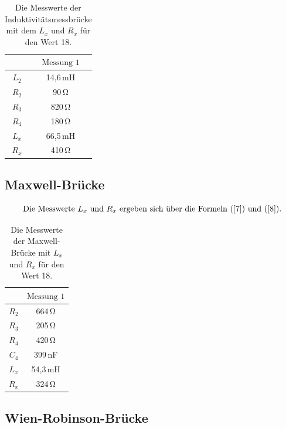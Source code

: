 \begin{table}[H]
    \centering
    \caption{Die Messwerte der Induktivitätsmessbrücke mit dem $L_{x}$ und $R_{x}$ für den Wert 18.}
    \label{Tabelle4}
    \begin{tabular} {c  c}
        \toprule
        {$ $} &
        {$ \text{Messung 1} $} \\
        \midrule
        $L_{2}$ & 14,6\,\unit{\milli\henry}\\
        $R_{2}$ & 90\,\unit{\ohm} \\
        $R_{3}$ & 820\,\unit{\ohm} \\
        $R_{4}$ & 180\,\unit{\ohm} \\
        $L_{x}$ & 66,5\,\unit{\milli\henry}\\
        $R_{x}$ & 410\,\unit{\ohm} \\
        \bottomrule
    \end{tabular} 
\end{table}

\subsection{Maxwell-Brücke}

\begin{align*}
    \intertext{Die Messwerte $L_{x}$ und $R_{x}$ ergeben sich über die Formeln (\ref{7}) und (\ref{8}).}
\end{align*}

\begin{table}[H] 
    \centering
    \caption{Die Messwerte der Maxwell-Brücke mit $L_{x}$ und $R_{x}$ für den Wert 18.}
    \label{Tabelle5}
    \begin{tabular} {c  c}
        \toprule
        {$ $} &
        {$ \text{Messung 1} $} \\
        \midrule
        $R_{2}$ & 664\,\unit{\ohm} \\
        $R_{3}$ & 205\,\unit{\ohm} \\
        $R_{4}$ & 420\,\unit{\ohm} \\
        $C_{4}$ & 399\,\unit{\nano\farad}\\
        $L_{x}$ & 54,3\,\unit{\milli\henry}\\
        $R_{x}$ & 324\,\unit{\ohm} \\
        \bottomrule
    \end{tabular} 
\end{table}

\subsection{Wien-Robinson-Brücke}


